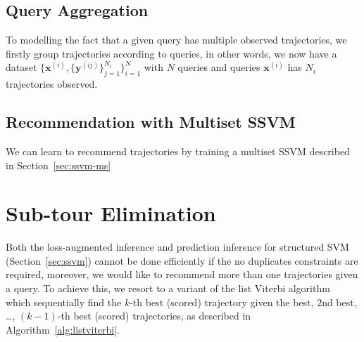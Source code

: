 \subsection{Query Aggregation}
\label{sec:query}

To modelling the fact that a given query has multiple observed trajectories, 
we firstly group trajectories according to queries, in other words,
we now have a dataset $\{\mathbf{x}^{(i)}, \{\mathbf{y}^{(ij)}\}_{j=1}^{N_i}\}_{i=1}^N$
with $N$ queries and queries $\mathbf{x}^{(i)}$ has $N_i$ trajectories observed.


\subsection{Recommendation with Multiset SSVM}
\label{sec:trajrec-ssvm}

We can learn to recommend trajectories by training a multiset SSVM described in Section~\ref{sec:ssvm-ms}



\section{Sub-tour Elimination}
\label{sec:subtour}

Both the loss-augmented inference and prediction inference for structured SVM (Section~\ref{sec:ssvm}) cannot be done efficiently 
if the no duplicates constraints are required, moreover, we would like to recommend more than one trajectories given a query.
To achieve this, we resort to a variant of the list Viterbi algorithm~\cite{nilsson2001sequentially,seshadri1994list}
which sequentially find the $k$-th best (scored) trajectory given the best, $2$nd best, \dots, $(k-1)$-th best (scored) trajectories,
as described in Algorithm~\ref{alg:listviterbi}.


